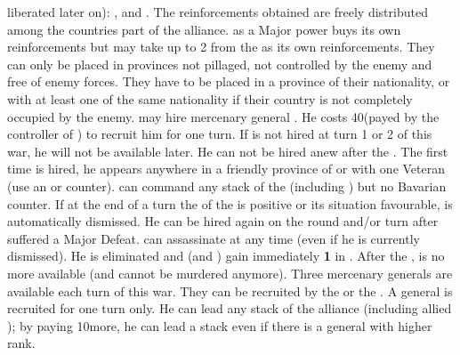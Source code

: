 \begin{digressions}
  liberated later on): \villeVienne, \villeSalzburg and \villeMunich.
  \bparag The reinforcements obtained are freely distributed among the
  countries part of the alliance. \AUS as a Major power buys its own
  reinforcements but may take up to 2 \LD from the \ligue as its own
  reinforcements.
  \bparag They can only be placed in provinces not pillaged, not controlled by
  the enemy and free of enemy forces.
  \bparag They have to be placed in a province of their nationality, or with
  at least one \LD of the same nationality if their country is not completely
  occupied by the enemy.
  \aparag[Wallenstein] \HAB may hire mercenary general
  . He costs 40\ducats (payed by the controller of
  \ligue) to recruit him for one turn.
  \bparag If \leaderWallenstein is not hired at turn 1 or 2 of this war, he
  will not be available later. He can not be hired anew after the
  . The first time \leaderWallenstein is hired,
  he appears anywhere in a friendly province of \payshabsbourg or \paysBoheme
  with one Veteran \ARMY\faceplus (use an \AUS or \HRE counter).
  \bparag \leaderWallenstein can command any stack of the \ligue (including
  \HAB) but no Bavarian counter.
  \bparag If at the end of a turn the \STAB of the \ligue is positive or its
  situation favourable, \leaderWallenstein is automatically dismissed. He can
  be hired again on the round and/or turn after \ligue suffered a Major
  Defeat.
  \bparag \MAJHAB can assassinate \leaderWallenstein at any time (even if he
  is currently dismissed). He is eliminated and \ligue (and \AUT) gain
  immediately {\bf 1} in \STAB.
  \bparag After the , \leaderWallenstein is no
  more available (and cannot be murdered anymore).
  \aparag Three mercenary generals are available each turn of this war.  They
  can be recruited by the \ligue or the \alliance. A general is recruited for
  one turn only. He can lead any stack of the alliance (including allied
  \MAJ); by paying 10\ducats more, he can lead a stack even if there is a
  general with higher rank.




\end{digressions}
